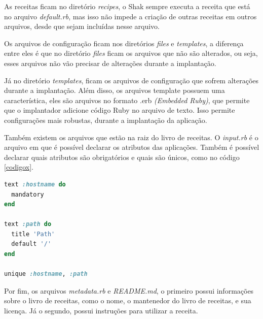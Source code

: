 As receitas ficam no diretório \textit{recipes}, o Shak sempre executa a receita que está
no arquivo \textit{default.rb}, mas isso não impede a criação de outras receitas em outros arquivos,
desde que sejam incluídas nesse arquivo. 

Os arquivos de configuração ficam nos diretórios \textit{files} e \textit{templates},
a diferença entre eles é que no diretório \textit{files} ficam os arquivos que
não são alterados, ou seja, esses arquivos não vão precisar de alterações
durante a implantação. 

Já no diretório \textit{templates}, ficam os arquivos de configuração que sofrem alterações durante 
a implantação. Além disso, os arquivos template possuem uma característica, eles 
são arquivos no formato .erb \textit{(Embedded Ruby)}, que permite que o 
implantador adicione código Ruby no arquivo de texto. Isso permite configurações
mais robustas, durante a implantação da aplicação.

Também existem os arquivos que estão na raiz do livro de receitas. O \textit{input.rb}
é o arquivo em que é possível declarar os atributos das aplicações. 
Também é possível declarar quais atributos são obrigatórios e quais são únicos,
como no código \ref{codigox}.

\begin{lstlisting}[language=Ruby,label=dice_index,caption={Exemplo de código no arquivo input.rb}, label=codigox]
text :hostname do                                                                                                                  title 'Website domain'                                                        
  mandatory                                                                     
end                                                                             
                                                                                
text :path do                                                                   
  title 'Path'                                                                  
  default '/'                                                                   
end                                                                             
                                                                                
unique :hostname, :path 
\end{lstlisting}

Por fim, os arquivos \textit{metadata.rb} e \textit{README.md}, o primeiro possui
informações sobre o livro de receitas, como o nome, o mantenedor do livro
de receitas, e sua licença. Já o segundo, possui instruções para utilizar a 
receita.

